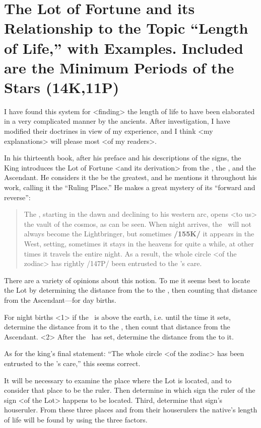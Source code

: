\section{The Lot of Fortune and its Relationship to the Topic “Length of Life,” with Examples. Included are the Minimum Periods of the Stars (14K,11P)}

I have found this system for <finding> the length of life to have been elaborated in a very complicated manner by the ancients. After investigation, I have modified their doctrines in view of my experience, and I think <my explanations> will please most <of my readers>. 

In his thirteenth book, after his preface and his descriptions of the signs, the King introduces the Lot of Fortune <and its derivation> from the \Sun, the \Moon, and the Ascendant. He considers it the be the greatest, and he mentions it throughout his work, calling it the “Ruling Place.” He makes a great mystery of its “forward and reverse”: 
\begin{quote}
The \Sun, starting in the dawn and declining to his western arc, opens <to us> the vault of the cosmos, as can be seen. When night arrives, the \Moon\, will not always become the Lightbringer, but sometimes \textbf{/155K/} it appears in the West, setting, sometimes it stays in the heavens for quite a while, at other times it travels the entire night. As a result, the whole circle <of the zodiac> has rightly /147P/ been entrusted to the \Sun’s care.
\end{quote}

There are a variety of opinions about this notion. To me it seems best to locate the Lot  by determining the distance from the \Sun\xspace to the \Moon, then counting that distance from the Ascendant—for day births. 

For night births <1> if the \Moon\, is above the earth, i.e. until the time it sets, determine the distance from it to the \Sun, then count that distance from the Ascendant. <2> After the \Moon\, has set, determine the distance from the \Sun\xspace to it. 

As for the king’s final statement: “The whole circle <of the
zodiac> has been entrusted to the \Sun’s care,” this seems correct. 

It will be necessary to examine the place where the Lot is located, and to consider that place to be the ruler. Then determine in which sign the ruler of the sign <of the Lot> happens to be located. Third, determine that sign’s houseruler. From these three places and from their houserulers the native’s length of life will be found by using the three factors.

